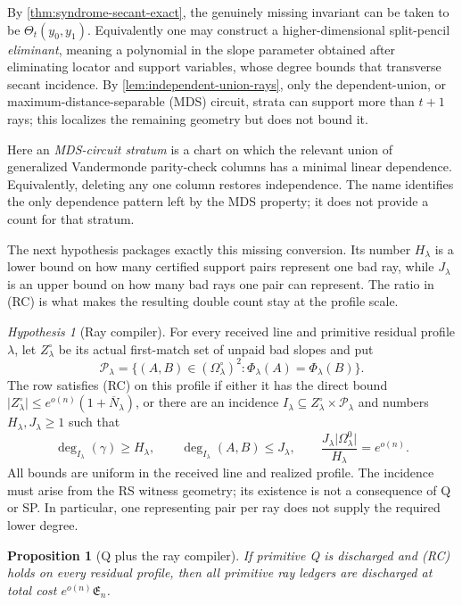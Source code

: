 \documentclass[12pt,a4paper]{amsart}
\numberwithin{equation}{section}
\newtheorem{proposition}[proposition]{Proposition}
\theoremstyle{remark}
\newtheorem{hypothesis}[theorem]{Hypothesis}
\newcommand{\Omc}{\Omega^{\circ}}
\newcommand{\Pcal}{\mathcal P}
\newcommand{\barN}{\overline N}
\newcommand{\abs}[1]{\lvert #1\rvert}
\begin{document}
By \cref{thm:syndrome-secant-exact}, the genuinely missing invariant can
be taken to be \(\Theta_t(y_0,y_1)\).  Equivalently one may construct a
higher-dimensional split-pencil \emph{eliminant}, meaning a polynomial in
the slope parameter obtained after eliminating locator and support
variables, whose degree bounds that
transverse secant incidence.  By
\cref{lem:independent-union-rays}, only the dependent-union, or
maximum-distance-separable (MDS) circuit,
strata can support more than \(t+1\) rays; this localizes the remaining
geometry but does not bound it.

Here an \emph{MDS-circuit stratum} is a chart on which the relevant union
of generalized Vandermonde parity-check columns has a minimal linear
dependence.  Equivalently, deleting any one column restores independence.
The name identifies the only dependence pattern left by the MDS property;
it does not provide a count for that stratum.

The next hypothesis packages exactly this missing conversion.  Its number
\(H_\lambda\) is a lower bound on how many certified support pairs represent
one bad ray, while \(J_\lambda\) is an upper bound on how many bad rays one
pair can represent.  The ratio in \textup{(RC)} is what makes the resulting
double count stay at the profile scale.

\begin{hypothesis}[Ray compiler]\label{hyp:ray-compiler}
For every received line and primitive residual profile \(\lambda\), let
\(Z_\lambda^\circ\) be its actual first-match set of unpaid bad slopes and
put
\[
 \Pcal_\lambda=\{(A,B)\in(\Omc_\lambda)^2:
                       \Phi_\lambda(A)=\Phi_\lambda(B)\}.
\]
The row satisfies \textup{(RC)} on this profile if either it has the direct
bound \(\abs{Z_\lambda^\circ}\le e^{o(n)}(1+\barN_\lambda)\), or there are
an incidence
\(I_\lambda\subseteq Z_\lambda^\circ\times\Pcal_\lambda\) and numbers
\(H_\lambda,J_\lambda\ge1\) such that
\[
 \deg_{I_\lambda}(\gamma)\ge H_\lambda,\qquad
 \deg_{I_\lambda}(A,B)\le J_\lambda,\qquad
 \frac{J_\lambda\abs{\Omega^0_\lambda}}{H_\lambda}=e^{o(n)}.
 \tag{RC}\label{eq:ray-compiler}
\]
All bounds are uniform in the received line and realized profile.  The
incidence must arise from the RS witness geometry; its existence is not a
consequence of Q or SP.  In particular, one representing pair per ray does
not supply the required lower degree.
\end{hypothesis}

\begin{proposition}[Q plus the ray compiler]\label{prop:q-implies-sp}
If primitive Q is discharged and \textup{(RC)} holds on every residual
profile, then all primitive ray ledgers are discharged
at total cost \(e^{o(n)}\mathfrak E_n\).
\end{proposition}
\end{document}
